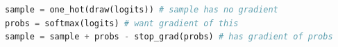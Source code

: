 \begin{algorithm}[b]
\fontsize{9.5}{12}\selectfont
\vspace*{-.8ex}
\begin{lstlisting}[language=Python]
sample = one_hot(draw(logits)) # sample has no gradient
probs = softmax(logits) # want gradient of this
sample = sample + probs - stop_grad(probs) # has gradient of probs
\end{lstlisting}
\vspace*{-.8ex}
\caption{使用自动微分实现直通梯度}
\label{alg:st}
\end{algorithm}
